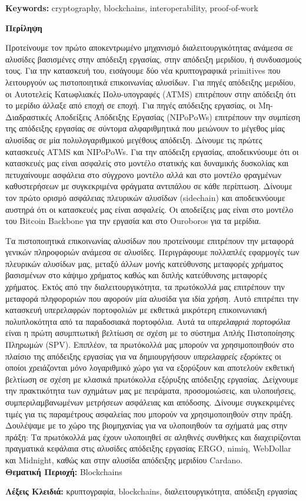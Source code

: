 \noindent
\textbf{Keywords:} cryptography, blockchains, interoperability, proof-of-work
\fi

\ifuniversity
\cleardoublepage
\begin{center}%
  {\bfseries Περίληψη}%
\end{center}%

Προτείνουμε τον πρώτο αποκεντρωμένο μηχανισμό διαλειτουργικότητας ανάμεσα σε
αλυσίδες βασισμένες στην απόδειξη εργασίας, στην απόδειξη μεριδίου, ή
συνδυασμούς τους. Για την κατασκευή του, εισάγουμε δύο νέα κρυπτογραφικά
primitives που λειτουργούν ως πιστοποιητικά επικοινωνίας αλυσίδων. Για πηγές
απόδειξης μεριδίου, οι Αυτοτελείς Κατωφλιακές
Πολυ-υπογραφές (ATMS) επιτρέπουν στην απόδειξη ότι το μερίδιο άλλαξε από εποχή
σε εποχή. Για πηγές απόδειξης εργασίας, οι Μη-Διαδραστικές Αποδείξεις Απόδειξης
Εργασίας (NIPoPoWs)
επιτρέπουν την συμπίεση της απόδειξης εργασίας σε σύντομα αλφαριθμητικά που
μειώνουν το μέγεθος μίας αλυσίδας σε μία πολυλογαριθμικού μεγέθους απόδειξη.
Δίνουμε τις πρώτες κατασκευές ATMS και NIPoPoWs. Για την απόδειξη εργασίας,
αποδεικνύουμε ότι οι κατασκευές μας είναι ασφαλείς στο μοντέλο στατικής και
δυναμικής δυσκολίας και πετυχαίνουμε ασφάλεια στο σύγχρονο μοντέλο αλλά και
στο μοντέλο φραγμένων καθυστερήσεων με συγκεκριμένα φράγματα αντιπάλου σε κάθε
περίπτωση. Δίνουμε τον πρώτο ορισμό ασφάλειας πλευρικών αλυσίδων (sidechain) και
αποδεικνύουμε αυστηρά ότι οι κατασκευές μας είναι ασφαλείς. Οι αποδείξεις μας
είναι στο μοντέλο του Bitcoin Backbone για την εργασία και στο Ouroboros για τα
μερίδια.

Τα πιστοποιητικά επικοινωνίας αλυσίδων που προτείνουμε επιτρέπουν την μεταφορά
γενικών πληροφοριών ανάμεσα σε αλυσίδες. Περιγράφουμε πολλαπλές εφαρμογές των
πλευρικών αλυσίδων μας, μεταξύ άλλων μονής κατεύθυνσης μεταφορές χρήματος βασισμένων
στο κάψιμο χρήματος καθώς και διπλής κατεύθυνσης μεταφορές χρήματος.
Εκτός από την διαλειτουργικότητα, τα πρωτόκολλά μας επιτρέπουν την μεταφορά
πληφοροριών που αφορούν μία αλυσίδα για ιδία χρήση.
Αυτό επιτρέπει την κατασκευή υπερελαφρών πορτοφολιών με εκθετικά μικρότερη
επικοινωνιακή πολυπλοκότητα από τα παραδοσιακά πορτοφόλια.
Αυτά τα \emph{υπερελαφριά πορτοφόλια} είναι η πρώτη ασυμπτωτική βελτίωση σε σχέση με
το σύστημα Απλής Πιστοποίησης Πληρωμών (SPV).
Επιπλέον, τα πρωτόκολλά μας μπορούν να χρησιμοποιηθούν στο πλαίσιο της απόδειξης
εργασίας για να δημιουργήσουν \emph{υπερελαφρείς εξορύκτες} οι οποίοι
χρειάζονται μόνο λογαριθμικό χώρο για να εξορύξουν και αποτελούν εκθετική
βελτίωση σε σχέση με κλασικά πρωτόκολλα εξόρυξης απόδειξης εργασίας.
Δείχνουμε την πρακτικότητα των σχημάτων μας με πειράματα, προσομοιώσεις, και
υλοποιήσεις, συμπεριλαμβανωμένων μετρήσεων ασφάλειας και απόδοσης.
Δίνουμε συγκεκριμένες τιμές για τις παραμέτρους ασφαλείας που μπορούν να
χρησιμοποιηθούν στην πράξη. Δουλέψαμε με το χώρο της βιομηχανίας για να
υλοποιηθούν τα σχήματά μας στην πράξη: Τα πρωτόκολλά μας έχουν υλοποιηθεί σε
αληθινές συνθήκες και διαχειρίζονται πραγματικά κεφάλαια στις αλυσίδες απόδειξης
εργασίας ERGO, nimiq, WebDollar και Midnight, καθώς και στην αλυσίδα απόδειξης
μεριδίου Cardano.\\

\noindent
\textbf{Θεματική Περιοχή:} Blockchains

\noindent
\textbf{Λέξεις Κλειδιά:} κρυπτογραφία, blockchains, διαλειτουργικότητα, απόδειξη
εργασίας
\fi
